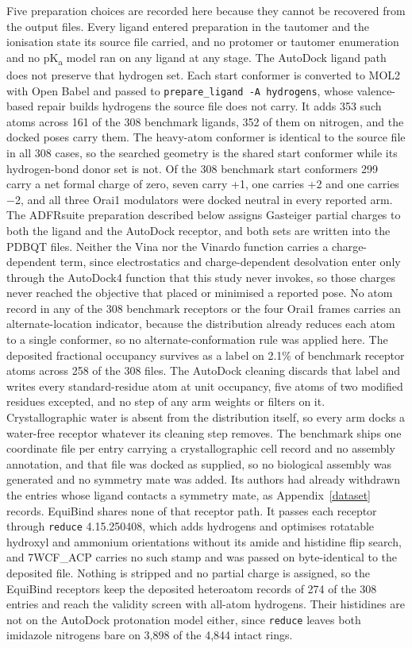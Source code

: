 Five preparation choices are recorded here because they cannot be recovered from the output files. Every ligand entered preparation in the tautomer and the ionisation state its source file carried, and no protomer or tautomer enumeration and no pK\textsubscript{a} model ran on any ligand at any stage. The AutoDock ligand path does not preserve that hydrogen set. Each start conformer is converted to MOL2 with Open Babel and passed to \texttt{prepare\_ligand -A hydrogens}, whose valence-based repair builds hydrogens the source file does not carry. It adds 353 such atoms across 161 of the 308 benchmark ligands, 352 of them on nitrogen, and the docked poses carry them. The heavy-atom conformer is identical to the source file in all 308 cases, so the searched geometry is the shared start conformer while its hydrogen-bond donor set is not. Of the 308 benchmark start conformers 299 carry a net formal charge of zero, seven carry +1, one carries +2 and one carries \ensuremath{-}2, and all three Orai1 modulators were docked neutral in every reported arm. The ADFRsuite preparation described below assigns Gasteiger partial charges to both the ligand and the AutoDock receptor, and both sets are written into the PDBQT files. Neither the Vina nor the Vinardo function carries a charge-dependent term, since electrostatics and charge-dependent desolvation enter only through the AutoDock4 function that this study never invokes, so those charges never reached the objective that placed or minimised a reported pose. No atom record in any of the 308 benchmark receptors or the four Orai1 frames carries an alternate-location indicator, because the distribution already reduces each atom to a single conformer, so no alternate-conformation rule was applied here. The deposited fractional occupancy survives as a label on 2.1\% of benchmark receptor atoms across 258 of the 308 files. The AutoDock cleaning discards that label and writes every standard-residue atom at unit occupancy, five atoms of two modified residues excepted, and no step of any arm weights or filters on it. Crystallographic water is absent from the distribution itself, so every arm docks a water-free receptor whatever its cleaning step removes. The benchmark ships one coordinate file per entry carrying a crystallographic cell record and no assembly annotation, and that file was docked as supplied, so no biological assembly was generated and no symmetry mate was added. Its authors had already withdrawn the entries whose ligand contacts a symmetry mate, as Appendix~\ref{dataset} records. EquiBind shares none of that receptor path. It passes each receptor through \texttt{reduce} 4.15.250408, which adds hydrogens and optimises rotatable hydroxyl and ammonium orientations without its amide and histidine flip search, and 7WCF\_ACP carries no such stamp and was passed on byte-identical to the deposited file. Nothing is stripped and no partial charge is assigned, so the EquiBind receptors keep the deposited heteroatom records of 274 of the 308 entries and reach the validity screen with all-atom hydrogens. Their histidines are not on the AutoDock protonation model either, since \texttt{reduce} leaves both imidazole nitrogens bare on 3,898 of the 4,844 intact rings.

